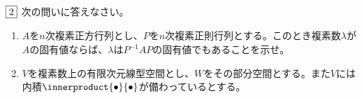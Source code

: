 \documentclass[dvipdfmx]{jsreport}
\begin{document}
\begin{tcolorbox} %
	$\fbox{2}$ 次の問いに答えなさい。
\begin{enumerate}
	\item $A$を$n$次複素正方行列とし、$P$を$n$次複素正則行列とする。このとき複素数$\lambda$が$A$の固有値ならば、$\lambda$は$P^{-1}AP$の固有値でもあることを示せ。
	\item $V$を複素数上の有限次元線型空間とし、$W$をその部分空間とする。また$V$には内積$\innerproduct{\bullet}{\bullet}$が備わっているとする。
\end{enumerate}
\end{tcolorbox}
\end{document}
